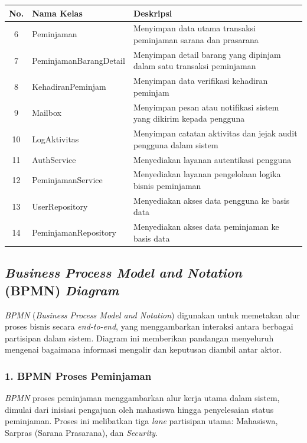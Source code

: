 \begin{table}[htbp]
    \centering
    \normalsize
    \label{tab:rincian_kelas_part2}
    \begin{tabular}{|c|p{4cm}|p{8cm}|}
        \hline
        \textbf{No.} & \textbf{Nama Kelas} & \textbf{Deskripsi} \\
        \hline
        6 & Peminjaman & Menyimpan data utama transaksi peminjaman sarana dan prasarana \\
        \hline
        7 & PeminjamanBarangDetail & Menyimpan detail barang yang dipinjam dalam satu transaksi peminjaman \\
        \hline
        8 & KehadiranPeminjam & Menyimpan data verifikasi kehadiran peminjam \\
        \hline
        9 & Mailbox & Menyimpan pesan atau notifikasi sistem yang dikirim kepada pengguna \\
        \hline
        10 & LogAktivitas & Menyimpan catatan aktivitas dan jejak audit pengguna dalam sistem \\
        \hline
        11 & AuthService & Menyediakan layanan autentikasi pengguna \\
        \hline
        12 & PeminjamanService & Menyediakan layanan pengelolaan logika bisnis peminjaman \\
        \hline
        13 & UserRepository & Menyediakan akses data pengguna ke basis data \\
        \hline
        14 & PeminjamanRepository & Menyediakan akses data peminjaman ke basis data \\
        \hline
    \end{tabular}
\end{table}

\newpage
\subsection{\textit{Business Process Model and Notation} (BPMN) \textit{Diagram}}
\textit{BPMN} (\textit{Business Process Model and Notation}) digunakan untuk memetakan alur proses bisnis secara \textit{end-to-end}, yang menggambarkan interaksi antara berbagai partisipan dalam sistem. Diagram ini memberikan pandangan menyeluruh mengenai bagaimana informasi mengalir dan keputusan diambil antar aktor.

\subsubsection{1. BPMN Proses Peminjaman}
\textit{BPMN} proses peminjaman menggambarkan alur kerja utama dalam sistem, dimulai dari inisiasi pengajuan oleh mahasiswa hingga penyelesaian status peminjaman. Proses ini melibatkan tiga \textit{lane} partisipan utama: Mahasiswa, Sarpras (Sarana Prasarana), dan \textit{Security}.

